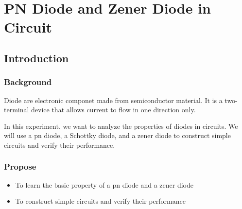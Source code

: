 \section{PN Diode and Zener Diode in Circuit}

\subsection{Introduction}
    \subsubsection{Background}
    Diode are electronic componet made from semiconductor material. It is a two-terminal device that allows current to flow in one direction only.\par

    In this experiment, we want to analyze the properties of diodes in circuits. We will use a pn diode, a Schottky diode, and a zener diode to construct simple circuits and verify their performance.\par

    \subsubsection{Propose}
    \begin{itemize}
        \item To learn the basic property of a pn diode and a zener diode
        \item To construct simple circuits and verify their performance
    \end{itemize}

